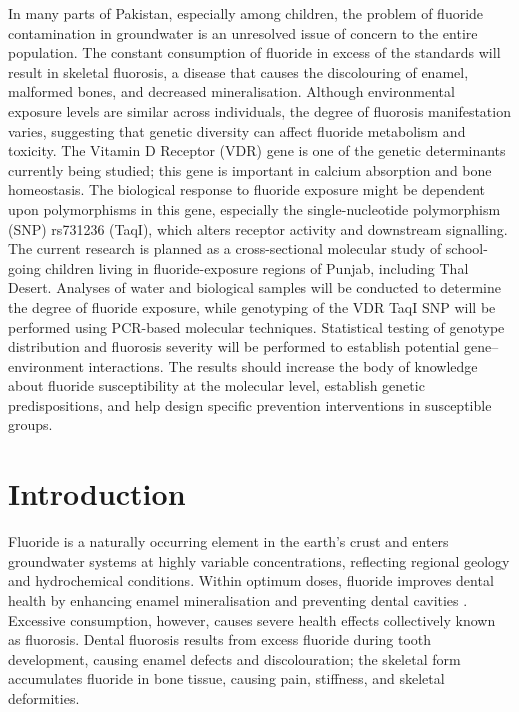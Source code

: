 \documentclass[12pt,a4paper]{article}
\begin{document}
In many parts of Pakistan, especially among children, the problem of fluoride contamination in
groundwater is an unresolved issue of concern to the entire population. The constant consumption
of fluoride in excess of the standards will result in skeletal fluorosis, a disease that causes the
discolouring of enamel, malformed bones, and decreased mineralisation. Although environmental
exposure levels are similar across individuals, the degree of fluorosis manifestation varies, suggesting
that genetic diversity can affect fluoride metabolism and toxicity. The Vitamin D Receptor (VDR)
gene is one of the genetic determinants currently being studied; this gene is important in calcium
absorption and bone homeostasis. The biological response to fluoride exposure might be dependent
upon polymorphisms in this gene, especially the single-nucleotide polymorphism (SNP) rs731236
(TaqI), which alters receptor activity and downstream signalling. The current research is planned as
a cross-sectional molecular study of school-going children living in fluoride-exposure regions of
Punjab, including Thal Desert. Analyses of water and biological samples will be conducted to
determine the degree of fluoride exposure, while genotyping of the VDR TaqI SNP will be performed
using PCR-based molecular techniques. Statistical testing of genotype distribution and fluorosis
severity will be performed to establish potential gene–environment interactions. The results should
increase the body of knowledge about fluoride susceptibility at the molecular level, establish genetic
predispositions, and help design specific prevention interventions in susceptible groups.

\section{Introduction}

Fluoride is a naturally occurring element in the earth's crust and enters groundwater systems at
highly variable concentrations, reflecting regional geology and hydrochemical conditions. Within
optimum doses, fluoride improves dental health by enhancing enamel mineralisation and preventing
dental cavities \citep{WHO2017}. Excessive consumption, however, causes severe health effects
collectively known as fluorosis. Dental fluorosis results from excess fluoride during tooth
development, causing enamel defects and discolouration; the skeletal form accumulates fluoride in
bone tissue, causing pain, stiffness, and skeletal deformities.
\end{document}
